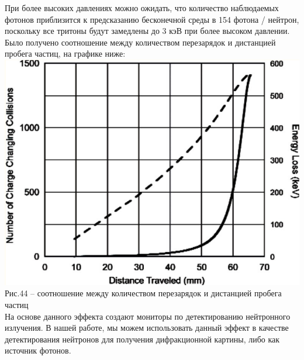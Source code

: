 \documentclass[11pt]{report}
\begin{document}
При более высоких давлениях можно ожидать, что количество наблюдаемых фотонов приблизится к предсказанию бесконечной среды в 154 фотона / нейтрон, поскольку все тритоны будут замедлены до 3 кэВ при более высоком давлении. \\

Было получено соотношение между количеством перезарядок и дистанцией пробега частиц, на графике ниже: \\

\includegraphics[scale=0.5]{lyman_x}\\
Рис.44 -- соотношение между количеством перезарядок и дистанцией пробега частиц \\

На основе данного эффекта создают мониторы по детектированию нейтронного излучения. В нашей работе, мы можем использовать данный эффект в качестве детектирования нейтронов для получения дифракционной картины, либо как источник фотонов.\\
\end{document}
